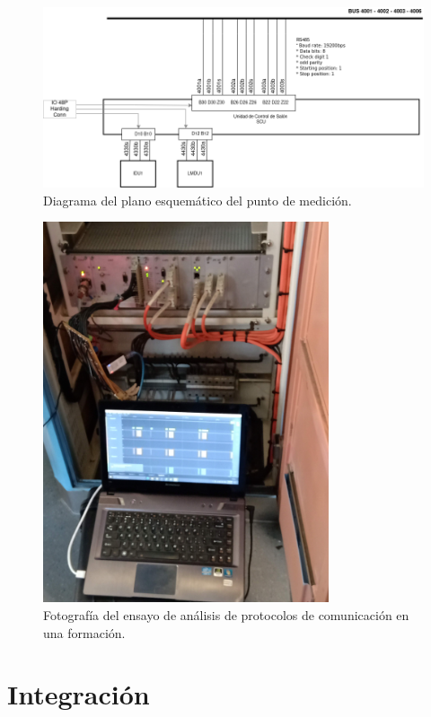 \documentclass[
11pt, %
]{charter}
\begin{document}
\begin{figure}[htpb]
\centering 
\includegraphics[width=1\textwidth]{./Pics/RedPIDS.drawio.png}
\caption{Diagrama del plano esquemático del punto de medición.}
\label{fig:test point SCU-PIDS diagram}
\end{figure}




\begin{figure}[htpb]
\centering 
\includegraphics[width=0.75\textwidth]{./Pics/IMG_20210414_104653.jpg}
\caption{Fotografía del ensayo de análisis de protocolos de comunicación en una formación.}
\label{fig:sniffingPhoto}
\end{figure}

\section{Integración}
\end{document}
